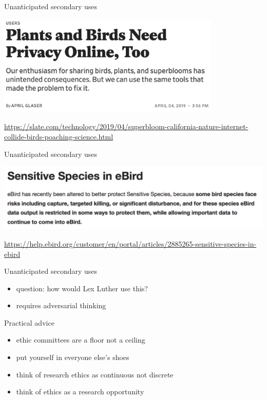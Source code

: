 \documentclass{beamer}
\begin{document}
\begin{frame}{Unanticipated secondary uses}

\begin{center}
\includegraphics[width=0.8\textwidth]{figures/glaser_plants_2019_title}
\end{center}

\vfill
\tiny{\url{https://slate.com/technology/2019/04/superbloom-california-nature-internet-collide-birds-poaching-science.html}}
\end{frame}
\begin{frame}{Unanticipated secondary uses}

\begin{center}
\includegraphics[width=\textwidth]{figures/ebird_sensitive_species}
\end{center}

\vfill
\tiny{\url{https://help.ebird.org/customer/en/portal/articles/2885265-sensitive-species-in-ebird}}
\end{frame}
\begin{frame}{Unanticipated secondary uses}

\begin{itemize}
\item question: how would Lex Luther use this?
\item requires adversarial thinking
\end{itemize}

\end{frame}
\begin{frame}{Practical advice}

\begin{itemize}
\item ethic committees are a floor not a ceiling
\item put yourself in everyone else's shoes
\item think of research ethics as continuous not discrete
\item think of ethics as a research opportunity
\end{itemize}

\end{frame}
\end{document}
